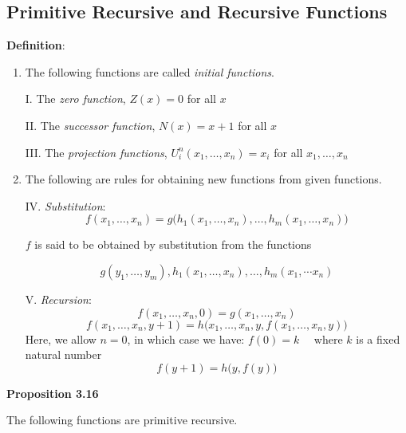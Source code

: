 \subsection{Primitive Recursive and Recursive Functions}

\textbf{Definition}:
\begin{enumerate}
    \item The following functions are called \textit{initial functions}.
        \begin{subitem} 
        I. The \textit{zero function}, $Z(x)=0$ for all $x$ 
        
        \end{subitem}
        
        \begin{subitem}
        II.  The \textit{successor function}, $N(x)=x+1$ for all $x$
        
        \end{subitem}
        \begin{subitem}
        III. The \textit{projection functions}, $U_i^n (x_1, \dots, x_n)=x_i$ for all $x_1, \dots, x_n$
        \end{subitem}
    \item The following are rules for obtaining new functions from given functions.
        \begin{subitem} IV. \textit{Substitution}: 
        \[f(x_1, \dots, x_n) = g\big(h_1(x_1, \dots, x_n), \dots, h_m(x_1, \dots, x_n)\big)\]

        \center $f$ is said to be obtained by substitution from the functions

        \[g(y_1, \dots, y_m), h_1(x_1, \dots, x_n), \dots, h_m(x_1, \dotsm x_n) \]
        \end{subitem}
        \begin{subitem}
        V. \textit{Recursion}:
        \[f(x_1, \dots, x_n, 0)=g(x_1, \dots, x_n)\]
        \[f(x_1, \dots, x_n, y+1) = h\big(x_1, \dots, x_n, y, f(x_1, \dots, x_n, y)\big)\]
        Here, we allow $n=0$, in which case we have:
        \center $f(0)=k\quad$ where $k$ is a fixed natural number
        \[f(y+1)=h\big(y, f(y)\big)\]
        \end{subitem}

\end{enumerate}



\textbf{Proposition 3.16}

The following functions are primitive recursive.

